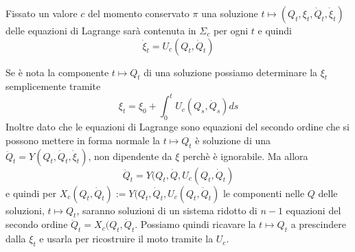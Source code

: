 \documentclass[11pt,a4paper,twoside]{book}
\theoremstyle{esss}
\theoremstyle{dotless}
\numberwithin{equation}{section} %
\begin{document}
Fissato un valore $c$ del momento conservato $\pi$ una soluzione $t\mapsto(Q_t,\xi_t,\dot{Q}_t,\dot{\xi}_t)$ delle equazioni di Lagrange sarà contenuta in $\Sigma_c$ per ogni $t$ e quindi 
\begin{equation}
\dot{\xi}_t=U_c(Q_t,\dot{Q}_t)
\end{equation}

Se è nota la componente $t\mapsto Q_t$ di una soluzione possiamo determinare la $\xi_t$ semplicemente tramite
\begin{equation}
\xi_t=\xi_0+\int_0^t U_c(Q_s,\dot{Q}_s) ds
\end{equation}
Inoltre dato che le equazioni di Lagrange sono equazioni del secondo ordine che si possono mettere in forma normale la $t\mapsto Q_t$ è soluzione di una $\ddot{Q}_t=Y(Q_t,\dot{Q}_t,\dot{\xi}_t)$, non dipendente da $\xi$ perchè è ignorabile. Ma allora 
\[
\ddot{Q}_t=Y(Q_t,\dot{Q},U_c(Q_t,\dot{Q}_t)
\]
e quindi per $X_c(Q_t,\dot{Q}_t):=Y(Q_t,\dot{Q}_t,U_c(Q_t,\dot{Q}_t)$ le componenti nelle $Q$ delle soluzioni, $t\mapsto Q_t$, saranno soluzioni di un sistema ridotto di $n-1$ equazioni del secondo ordine $\ddot{Q}_t=X_c(Q_t,\dot{Q}_t$. Possiamo quindi ricavare la $t\mapsto Q_t$ a prescindere dalla $\xi_t$ e usarla per ricostruire il moto tramite la $U_c$.
\end{document}
